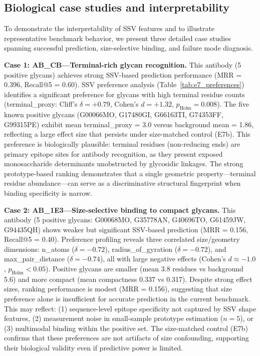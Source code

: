 \subsection{Biological case studies and interpretability}
\label{sec:case_studies}

To demonstrate the interpretability of SSV features and to illustrate representative benchmark behavior, we present three detailed case studies spanning successful prediction, size-selective binding, and failure mode diagnosis.

\textbf{Case 1: AB\_CB---Terminal-rich glycan recognition.} This antibody (5 positive glycans) achieves strong SSV-based prediction performance (MRR = 0.396, Recall@5 = 0.60). SSV preference analysis (Table~\ref{tab:e7_preferences}) identifies a significant preference for glycans with high terminal residue counts (terminal\_proxy: Cliff's $\delta = +0.79$, Cohen's $d = +1.32$, $p_{\text{Holm}} = 0.008$). The five known positive glycans (G00066MO, G17480GI, G66163TI, G74353FF, G99315PE) exhibit mean terminal\_proxy = 3.0 versus background mean = 1.86, reflecting a large effect size that persists under size-matched control (E7b). This preference is biologically plausible: terminal residues (non-reducing ends) are primary epitope sites for antibody recognition, as they present exposed monosaccharide determinants unobstructed by glycosidic linkages. The strong prototype-based ranking demonstrates that a single geometric property---terminal residue abundance---can serve as a discriminative structural fingerprint when binding specificity is narrow.

\textbf{Case 2: AB\_1E3---Size-selective binding to compact glycans.} This antibody (5 positive glycans: G00068MO, G35778AN, G40696TO, G61459JW, G94435QH) shows weaker but significant SSV-based prediction (MRR = 0.156, Recall@5 = 0.40). Preference profiling reveals three correlated size/geometry dimensions: n\_atoms ($\delta = -0.72$), radius\_of\_gyration ($\delta = -0.72$), and max\_pair\_distance ($\delta = -0.74$), all with large negative effects (Cohen's $d \approx -1.0$, $p_{\text{Holm}} < 0.05$). Positive glycans are smaller (mean 3.8 residues vs background 5.6) and more compact (mean compactness 0.337 vs 0.317). Despite strong effect sizes, ranking performance is modest (MRR = 0.156), suggesting that size preference alone is insufficient for accurate prediction in the current benchmark. This may reflect: (1) sequence-level epitope specificity not captured by SSV shape features, (2) measurement noise in small-sample prototype estimation ($n = 5$), or (3) multimodal binding within the positive set. The size-matched control (E7b) confirms that these preferences are not artifacts of size confounding, supporting their biological validity even if predictive power is limited.

